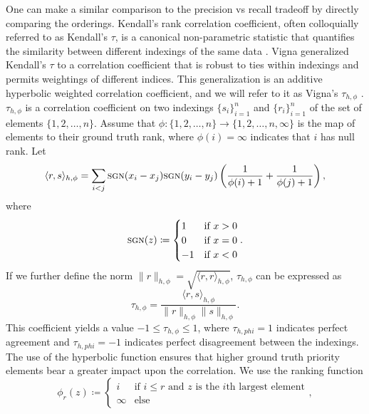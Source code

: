 \documentclass[10]{report}
\newcommand{\algoname}[1]{\textnormal{\textsc{#1}}}
\begin{document}
One can make a similar comparison to the precision vs recall tradeoff by directly comparing the orderings.
Kendall's rank correlation coefficient, often colloquially referred to as Kendall's $\tau$, is a canonical non-parametric statistic that quantifies the similarity between different indexings of the same data \cite{kendall1938new}.
Vigna generalized Kendall's $\tau$ to a correlation coefficient that is robust to ties within indexings and permits weightings of different indices.
This generalization is an additive hyperbolic weighted correlation coefficient, and we will refer to it as Vigna's $\tau_{h, \phi}$ \cite{vigna2015weighted}.
$\tau_{h, \phi}$ is a correlation coefficient on two indexings $\{s_i\}_{i=1}^n$ and $\{r_i\}_{i=1}^n$ of the set of elements $\{1, 2, \dots, n\}$.
Assume that $\phi : \{1, 2, \dots, n\} \rightarrow \{1, 2, \dots, n, \infty\}$ is the map of elements to their ground truth rank, where $\phi(i) = \infty$ indicates that $i$ has null rank. 
Let
%
\begin{equation} \label{eq:tau_inner}
\langle r, s \rangle_{h, \phi} = \sum_{i < j} \algoname{sgn}(x_i - x_j)\algoname{sgn}(y_i - y_j) \left ( \frac{1}{\phi(i)+ 1} + \frac{1}{\phi(j)+ 1} \right ),
\end{equation}
%
where 
%
\begin{equation} \label{eq:sgn}
\algoname{sgn}(z) \coloneqq 
\begin{cases}
	1 &\text{if $x > 0$}\\
	0 &\text{if $x = 0$}\\
	-1 &\text{if $x < 0$}
\end{cases}. 
\end{equation}
%
If we further define the norm $\| r \|_{h, \phi} = \sqrt{ \langle r, r \rangle_{h, \phi}}$, $\tau_{h, \phi}$ can be expressed as 
%
\begin{equation} \label{eq:tau}
\tau_{h, \phi} = \frac{\langle r, s \rangle_{h, \phi}} {\| r \|_{h, \phi} \| s \|_{h, \phi}}.
\end{equation}
%
This coefficient yields a value $-1 \leq \tau_{h, \phi} \leq 1$, where $\tau_{h, phi} = 1$ indicates perfect agreement and $\tau_{h, phi} = -1$ indicates perfect disagreement between the indexings.
The use of the hyperbolic function ensures that higher ground truth priority elements bear a greater impact upon the correlation. 
We use the ranking function
%
\begin{equation} \label{eq:phi}
\phi_r(z) \coloneqq 
\begin{cases}
	i &\text{if $i \leq r$ and $z$ is the $i$th largest element}\\
	\infty &\text{else}
\end{cases},
\end{equation}
\end{document}
